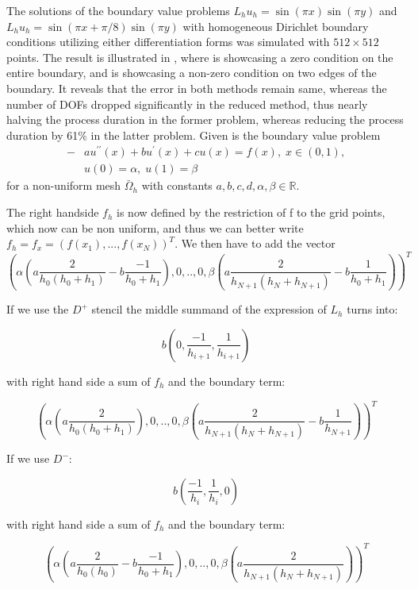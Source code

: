 The solutions of the boundary value problems $L_h u_h = \sin{(\pi x)} \sin{(\pi y)} $ and $L_h u_h = \sin{(\pi x + \pi/8)} \sin{(\pi y)} $ with homogeneous Dirichlet boundary conditions utilizing either differentiation forms was simulated with $512 \times 512$ points.
The result is illustrated in , where  is showcasing a zero condition on the entire boundary, and  is showcasing a non-zero condition on two edges of the boundary.
It reveals that the error in both methods remain same, whereas the number of DOFs dropped significantly in the reduced method, thus nearly halving the process duration in the former problem, whereas reducing the process duration by 61\% in the latter problem.
%
Given is the boundary value problem
\begin{align}
	-&au^{\prime \prime}(x) + bu^\prime(x)+cu(x) = f(x), \; x\in(0,1), \\
	&u(0)=\alpha, \; u(1)=\beta
\end{align}
for a non-uniform mesh $\bar{\Omega}_h$ with constants $a, b, c, d, \alpha, \beta \in \mathbb{R}$.
%

The right handside $f_h$ is now defined by the restriction of f to the grid points, which now can be  non uniform, and thus we can better write $f_h=f_{x}=(f(x_1),...,f(x_N))^T$. We then have to add the vector
$$
(\alpha(a\frac{2}{h_0(h_0+h_{1})}-b\frac{-1}{h_0+h_1}),0,..,0,\beta(a\frac{2}{h_{N+1}(h_N+h_{N+1})}-b\frac{1}{h_0+h_1}))^T
$$

If we use the $D^+$ stencil the middle summand of the expression of $L_h$ turns into:

$$
b(0,\frac{-1}{h_{i+1}},\frac{1}{h_{i+1}})
$$

with right hand side a sum of $f_h$ and the boundary term:

$$
(\alpha(a\frac{2}{h_0(h_0+h_{1})}),0,..,0,\beta(a\frac{2}{h_{N+1}(h_N+h_{N+1})}-b\frac{1}{h_{N+1}}))^T
$$


If we use $D^-$:

$$
b(\frac{-1}{h_{i}},\frac{1}{h_{i}},0)
$$

with right hand side a sum of $f_h$ and the boundary term:

$$
(\alpha(a\frac{2}{h_0(h_0)}-b\frac{-1}{h_0+h_1}),0,..,0,\beta(a\frac{2}{h_{N+1}(h_N+h_{N+1})}))^T
$$


